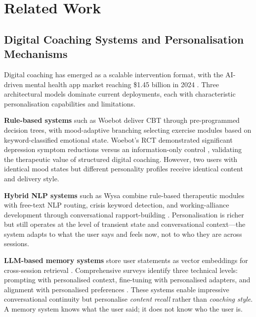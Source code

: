 \documentclass[10pt,a4paper]{report}
\begin{document}
\chapter{Related Work}
\label{ch:related}

\section{Digital Coaching Systems and Personalisation Mechanisms}

Digital coaching has emerged as a scalable intervention format, with the AI-driven mental health app market reaching \$1.45 billion in 2024 \citep{GrandView2024}. Three architectural models dominate current deployments, each with characteristic personalisation capabilities and limitations.

\textbf{Rule-based systems} such as Woebot \citep{Fitzpatrick2017} deliver CBT through pre-programmed decision trees, with mood-adaptive branching selecting exercise modules based on keyword-classified emotional state. Woebot's RCT demonstrated significant depression symptom reductions versus an information-only control \citep{Fitzpatrick2017}, validating the therapeutic value of structured digital coaching. However, two users with identical mood states but different personality profiles receive identical content and delivery style.

\textbf{Hybrid NLP systems} such as Wysa \citep{Inkster2018} combine rule-based therapeutic modules with free-text NLP routing, crisis keyword detection, and working-alliance development through conversational rapport-building \citep{Beatty2022}. Personalisation is richer but still operates at the level of transient state and conversational context---the system adapts to what the user says and feels now, not to who they are across sessions.

\textbf{LLM-based memory systems} store user statements as vector embeddings for cross-session retrieval \citep{Li2024}. Comprehensive surveys identify three technical levels: prompting with personalised context, fine-tuning with personalised adapters, and alignment with personalised preferences \citep{Chen2025, Wang2026}. These systems enable impressive conversational continuity but personalise \emph{content recall} rather than \emph{coaching style}. A memory system knows what the user said; it does not know who the user is.
\end{document}
